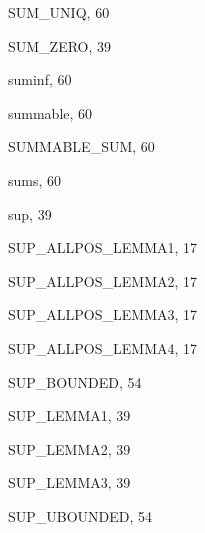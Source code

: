 \begin{theindex}
  \item {\ptt SUM\_UNIQ}, 60
  \item {\ptt SUM\_ZERO}, 39
  \item {\ptt suminf}, 60
  \item {\ptt summable}, 60
  \item {\ptt SUMMABLE\_SUM}, 60
  \item {\ptt sums}, 60
  \item {\ptt sup}, 39
  \item {\ptt SUP\_ALLPOS\_LEMMA1}, 17
  \item {\ptt SUP\_ALLPOS\_LEMMA2}, 17
  \item {\ptt SUP\_ALLPOS\_LEMMA3}, 17
  \item {\ptt SUP\_ALLPOS\_LEMMA4}, 17
  \item {\ptt SUP\_BOUNDED}, 54
  \item {\ptt SUP\_LEMMA1}, 39
  \item {\ptt SUP\_LEMMA2}, 39
  \item {\ptt SUP\_LEMMA3}, 39
  \item {\ptt SUP\_UBOUNDED}, 54

  \indexspace


\end{theindex}
